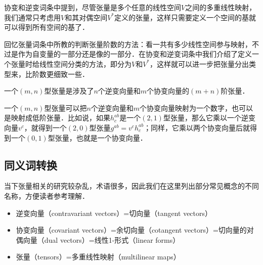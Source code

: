 
\begin{issues}
\issueDraft
\end{issues}


协变和逆变词条中提到，尽管张量是多个任意的线性空间$V$之间的多重线性映射，我们通常只考虑用$V$和其对偶空间$V^*$定义的张量，这样只需要定义一个空间的基就可以得到所有空间的基了．

回忆张量词条中所教的判断张量阶数的方法：看一共有多少线性空间参与映射，不过是作为自变量的一部分还是像的一部分．在协变和逆变词条中我们介绍了定义一个张量时给线性空间分类的方法，即分为$V$和$V^*$，这样就可以进一步把张量分出类型来，比阶数更细致一些．

\begin{definition}{}
一个$(m, n)$型张量是涉及了$n$个逆变向量和$m$个协变向量的$(m+n)$阶张量．
\end{definition}

一个$(m, n)$型张量可以把$n$个逆变向量和$m$个协变向量映射为一个数字，也可以是映射成低阶张量．比如说，如果$h^{ab}_c$是一个$(2, 1)$型张量，那么它乘以一个逆变向量$v^c$，就得到一个$(2, 0)$型张量$g^{ab}=v^ch^{ab}_c$；同样，它乘以两个协变向量后就得到一个$(0, 1)$型张量，也就是一个协变向量．

\subsection{同义词转换}

当下张量相关的研究较杂乱，术语很多，因此我们在这里列出部分常见概念的不同名称，方便读者参考理解．


\begin{itemize}
\item 逆变向量（contravariant vectors）=切向量（tangent vectors）
\item 协变向量（covariant vectors）=余切向量（cotangent vectors）=切向量的对偶向量（dual vectors）=线性1-形式（linear forms）
\item 张量（tensors）=多重线性映射（multilinear maps）
\end{itemize}







